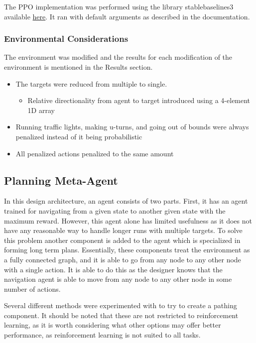 \documentclass{article}
\begin{document}
    The PPO implementation was performed using the library stable\textunderscore baselines3 available  \href{https://stable-baselines3.readthedocs.io/en/master/}{here}. It ran with default arguments as described in the documentation.
    
    \subsubsection{Environmental Considerations}
    \label{considerations}
    The environment was modified and the results for each modification of the environment is mentioned in the Results section.
    \begin{itemize}
        \item The targets were reduced from multiple to single. 
        \begin{itemize}
            \item Relative directionality from agent to target introduced using a 4-element 1D array
        \end{itemize}
        \item Running traffic lights, making u-turns, and going out of bounds were always penalized instead of it being probabilistic
        \item All penalized actions penalized to the same amount
    \end{itemize}
    
    \subsection{Planning Meta-Agent}
    \label{planning}
    In this design architecture, an agent consists of two parts. First, it has an agent trained for navigating from a given state to another given state with the maximum reward. However, this agent alone has limited usefulness as it does not have any reasonable way to handle longer runs with multiple targets. To solve this problem another component is added to the agent which is specialized in forming long term plans. Essentially, these components treat the environment as a fully connected graph, and it is able to go from any node to any other node with a single action. It is able to do this as the designer knows that the navigation agent is able to move from any node to any other node in some number of actions.
    
    Several different methods were experimented with to try to create a pathing component. It should be noted that these are not restricted to reinforcement learning, as it is worth considering what other options may offer better performance, as reinforcement learning is not suited to all tasks.
    
\end{document}
